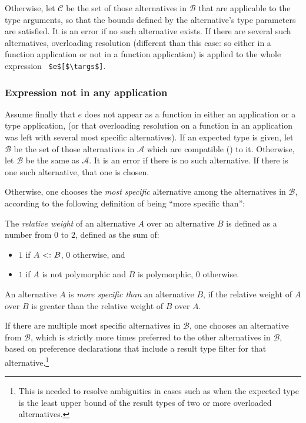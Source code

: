 Otherwise, let $\mathcal{C}$ be the set of those alternatives in $\mathcal{B}$ that are applicable to the type arguments, so that the bounds defined by the alternative's type parameters are satisfied. It is an error if no such alternative exists. If there are several such alternatives, overloading resolution (different than this case: so either in a function application or not in a function application) is applied to the whole expression ~\lstinline!$e$[$\targs$]!. 






\subsubsection{Expression not in any application}
\label{sec:overloading-resolution-no-app}

Assume finally that $e$ does not appear as a function in either an application or a type application, (or that overloading resolution on a function in an application was left with several most specific alternatives). If an expected type is given, let $\mathcal{B}$ be the set of those alternatives in $\mathcal{A}$ which are compatible () to it. Otherwise, let $\mathcal{B}$ be the same as $\mathcal{A}$. It is an error if there is no such alternative. If there is one such alternative, that one is chosen. 

Otherwise, one chooses the {\em most specific} alternative among the alternatives in $\mathcal{B}$, according to the following definition of being ``more specific than'':

\begin{definition}
The {\em relative weight} of an alternative $A$ over an alternative $B$ is defined as a number from $0$ to $2$, defined as the sum of:
\begin{itemize}
  \item $1$ if $A \conforms B$, $0$ otherwise, and
  \item $1$ if $A$ is not polymorphic and $B$ is polymorphic, $0$ otherwise.
\end{itemize}
\end{definition}

An alternative $A$ is {\em more specific than} an alternative $B$, if the relative weight of $A$ over $B$ is greater than the relative weight of $B$ over $A$. 

If there are multiple most specific alternatives in $\mathcal{B}$, one chooses an alternative from $\mathcal{B}$, which is strictly more times preferred to the other alternatives in $\mathcal{B}$, based on preference declarations that include a result type filter for that alternative.\footnote{This is needed to resolve ambiguities in cases such as when the expected type is the least upper bound of the result types of two or more overloaded alternatives.}

